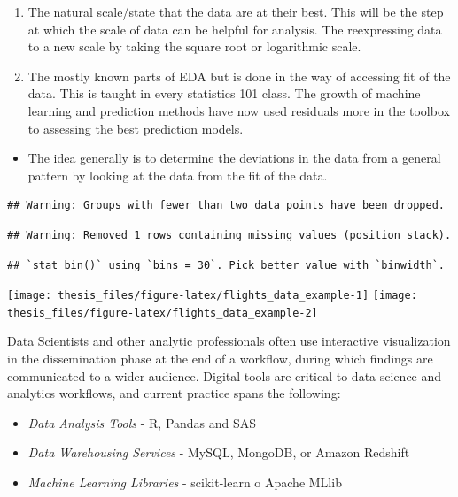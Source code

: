 \documentclass[print]{nuthesis}
\providecommand{\tightlist}{%
  \setlength{\itemsep}{0pt}\setlength{\parskip}{0pt}}
\begin{document}
\begin{enumerate}
\def\labelenumi{\arabic{enumi}.}
\setcounter{enumi}{2}
\item
  The natural scale/state that the data are at their best. This will be the step at which the scale of data can be helpful for analysis. The reexpressing data to a new scale by taking the square root or logarithmic scale.
\item
  The mostly known parts of EDA but is done in the way of accessing fit of the data. This is taught in every statistics 101 class. The growth of machine learning and prediction methods have now used residuals more in the toolbox to assessing the best prediction models.
\end{enumerate}

\begin{itemize}
\tightlist
\item
  The idea generally is to determine the deviations in the data from a general pattern by looking at the data from the fit of the data.
\end{itemize}

\begin{verbatim}
## Warning: Groups with fewer than two data points have been dropped.
\end{verbatim}

\begin{verbatim}
## Warning: Removed 1 rows containing missing values (position_stack).
\end{verbatim}

\begin{verbatim}
## `stat_bin()` using `bins = 30`. Pick better value with `binwidth`.
\end{verbatim}

\begin{center}\texttt{[image: thesis\_files/figure-latex/flights\_data\_example-1]} \texttt{[image: thesis\_files/figure-latex/flights\_data\_example-2]} \end{center}

Data Scientists and other analytic professionals often use interactive visualization in the dissemination phase at the end of a workflow, during which findings are communicated to a wider audience. Digital tools are critical to data science and analytics workflows, and current practice spans the following:

\begin{itemize}
\tightlist
\item
  \emph{Data Analysis Tools} - R, Pandas and SAS
\item
  \emph{Data Warehousing Services} - MySQL, MongoDB, or Amazon Redshift
\item
  \emph{Machine Learning Libraries} - scikit-learn o Apache MLlib
\end{itemize}
\end{document}

